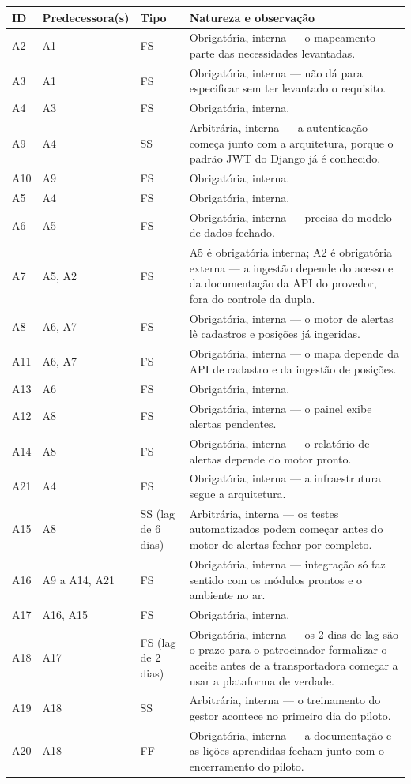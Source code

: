 \documentclass[11pt,a4paper]{article}
\begin{document}
\begin{center}
\footnotesize
\begin{tabularx}{\textwidth}{l L l L}
\toprule
\textbf{ID} & \textbf{Predecessora(s)} & \textbf{Tipo} & \textbf{Natureza e observação} \\
\midrule
A2  & A1 & FS & Obrigatória, interna --- o mapeamento parte das necessidades levantadas. \\
A3  & A1 & FS & Obrigatória, interna --- não dá para especificar sem ter levantado o requisito. \\
A4  & A3 & FS & Obrigatória, interna. \\
A9  & A4 & SS & Arbitrária, interna --- a autenticação começa junto com a arquitetura, porque o padrão JWT do Django já é conhecido. \\
A10 & A9 & FS & Obrigatória, interna. \\
A5  & A4 & FS & Obrigatória, interna. \\
A6  & A5 & FS & Obrigatória, interna --- precisa do modelo de dados fechado. \\
A7  & A5, A2 & FS & A5 é obrigatória interna; A2 é obrigatória externa --- a ingestão depende do acesso e da documentação da API do provedor, fora do controle da dupla. \\
A8  & A6, A7 & FS & Obrigatória, interna --- o motor de alertas lê cadastros e posições já ingeridas. \\
A11 & A6, A7 & FS & Obrigatória, interna --- o mapa depende da API de cadastro e da ingestão de posições. \\
A13 & A6 & FS & Obrigatória, interna. \\
A12 & A8 & FS & Obrigatória, interna --- o painel exibe alertas pendentes. \\
A14 & A8 & FS & Obrigatória, interna --- o relatório de alertas depende do motor pronto. \\
A21 & A4 & FS & Obrigatória, interna --- a infraestrutura segue a arquitetura. \\
A15 & A8 & SS (lag de 6 dias) & Arbitrária, interna --- os testes automatizados podem começar antes do motor de alertas fechar por completo. \\
A16 & A9 a A14, A21 & FS & Obrigatória, interna --- integração só faz sentido com os módulos prontos e o ambiente no ar. \\
A17 & A16, A15 & FS & Obrigatória, interna. \\
A18 & A17 & FS (lag de 2 dias) & Obrigatória, interna --- os 2 dias de lag são o prazo para o patrocinador formalizar o aceite antes de a transportadora começar a usar a plataforma de verdade. \\
A19 & A18 & SS & Arbitrária, interna --- o treinamento do gestor acontece no primeiro dia do piloto. \\
A20 & A18 & FF & Obrigatória, interna --- a documentação e as lições aprendidas fecham junto com o encerramento do piloto. \\
\bottomrule
\end{tabularx}
\end{center}
\end{document}
